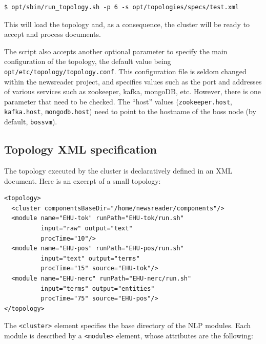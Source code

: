 \documentclass[a4]{article}
\begin{document}
\begin{verbatim}
$ opt/sbin/run_topology.sh -p 6 -s opt/topologies/specs/test.xml
\end{verbatim}

This will load the topology and, as a consequence, the cluster will be ready
to accept and process documents.

The script also accepts another optional parameter to specify the main
configuration of the topology, the default value being
\texttt{opt/etc/topology/topology.conf}. This configuration file is seldom
changed within the newsreader project, and specifies values such as the port
and addresses of various services such as zookeeper, kafka, mongoDB,
etc. However, there is one parameter that need to be checked. The ``host''
values (\texttt{zookeeper.host}, \texttt{kafka.host}, \texttt{mongodb.host})
need to point to the hostname of the boss node (by default, \texttt{bossvm}).

\subsection{Topology XML specification}
\label{sec:topol-xml-spec}

The topology executed by the cluster is declaratively defined in an XML
document. Here is an excerpt of a small topology:

\begin{lstlisting}
<topology>
  <cluster componentsBaseDir="/home/newsreader/components"/>
  <module name="EHU-tok" runPath="EHU-tok/run.sh"
          input="raw" output="text"
          procTime="10"/>
  <module name="EHU-pos" runPath="EHU-pos/run.sh"
          input="text" output="terms"
          procTime="15" source="EHU-tok"/>
  <module name="EHU-nerc" runPath="EHU-nerc/run.sh"
          input="terms" output="entities"
          procTime="75" source="EHU-pos"/>
</topology>
\end{lstlisting}

The \texttt{<cluster>} element specifies the base directory of the NLP
modules. Each module is described by a \texttt{<module>} element, whose
attributes are the following:
\end{document}
